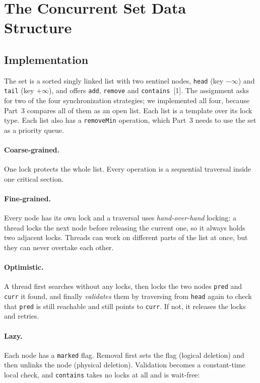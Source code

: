 \section{The Concurrent Set Data Structure}
\label{sec:clist}

\subsection{Implementation}

The set is a sorted singly linked list with two sentinel nodes, \texttt{head}
(key $-\infty$) and \texttt{tail} (key $+\infty$), and offers \texttt{add},
\texttt{remove} and \texttt{contains}~[1]. The assignment asks
for two of the four synchronization strategies; we implemented all four,
because Part~3 compares all of them as an open list. Each list is a template
over its lock type. Each list also has a \texttt{removeMin} operation, which
Part~3 needs to use the set as a priority queue.

\paragraph{Coarse-grained.} One lock protects the whole list. Every operation
is a sequential traversal inside one critical section.

\paragraph{Fine-grained.} Every node has its own lock and a traversal uses
\emph{hand-over-hand} locking: a thread locks the next node before releasing
the current one, so it always holds two adjacent locks. Threads can work on
different parts of the list at once, but they can never overtake each other.

\paragraph{Optimistic.} A thread first searches without any locks, then locks
the two nodes \texttt{pred} and \texttt{curr} it found, and finally
\emph{validates} them by traversing from \texttt{head} again to check that
\texttt{pred} is still reachable and still points to \texttt{curr}. If not, it
releases the locks and retries.

\paragraph{Lazy.} Each node has a \texttt{marked} flag. Removal first sets the
flag (logical deletion) and then unlinks the node (physical deletion).
Validation becomes a constant-time local check, and \texttt{contains} takes no
locks at all and is wait-free:

